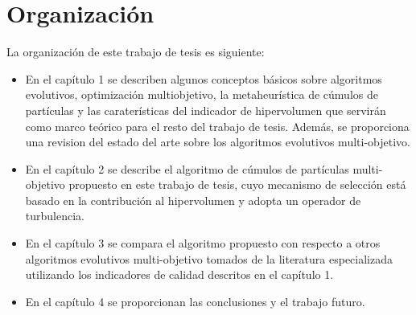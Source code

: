 \section*{Organizaci\'on}

La organizaci\'on de este trabajo de tesis es \DIFdelbegin {}\DIFdelend \DIFaddbegin {}\DIFaddend siguiente:

\begin{itemize}
 \item  En el cap\'itulo 1 se describen algunos conceptos b\'asicos sobre algoritmos evolutivos, optimizaci\'on multiobjetivo, 
 la metaheur\'istica de c\'umulos de part\'iculas y las carater\'isticas del indicador de hipervolumen que servir\'an como 
 marco te\'orico  para el resto del trabajo de tesis. Adem\'as, se proporciona una revision del estado del arte sobre los 
 algoritmos evolutivos multi-objetivo.
 \item En el cap\'itulo 2 se describe el algoritmo de c\'umulos de part\'iculas multi-objetivo propuesto en este trabajo de 
 tesis, cuyo mecanismo de selecci\'on est\'a basado en la contribuci\'on al hipervolumen y adopta un operador de turbulencia.
 \item En el cap\'itulo 3 se compara el algoritmo propuesto con respecto a otros algoritmos evolutivos multi-objetivo tomados
 de la literatura especializada  utilizando los indicadores de calidad descritos en el cap\'itulo 1.
 \item En el cap\'itulo 4 se proporcionan las conclusiones y el trabajo futuro.
\end{itemize}
